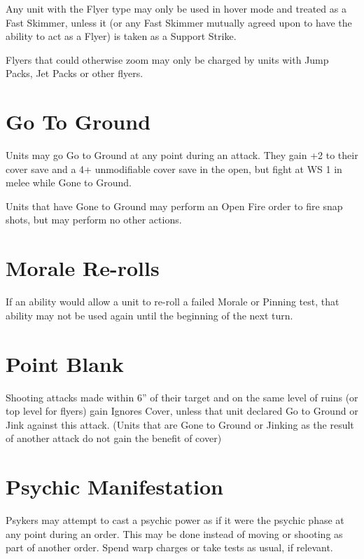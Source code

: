 \documentclass[letterpaper,twocolumn,oneside,titlepage]{book}
\begin{document}
Any unit with the Flyer type may only be used in hover mode and treated
as a Fast Skimmer, unless it (or any Fast Skimmer mutually agreed upon
to have the ability to act as a Flyer) is taken as a Support Strike.

Flyers that could otherwise zoom may only be charged by units with Jump
Packs, Jet Packs or other flyers.

\section{\texorpdfstring{\textbf{Go To
Ground}}{Go To Ground}}\label{go-to-ground}

Units may go Go to Ground at any point during an attack. They gain +2 to
their cover save and a 4+ unmodifiable cover save in the open, but fight
at WS 1 in melee while Gone to Ground.

Units that have Gone to Ground may perform an Open Fire order to fire
snap shots, but may perform no other actions.

\section{\texorpdfstring{\textbf{Morale
Re-rolls}}{Morale Re-rolls}}\label{morale-re-rolls}

If an ability would allow a unit to re-roll a failed Morale or Pinning
test, that ability may not be used again until the beginning of the next
turn.

\section{\texorpdfstring{\textbf{Point
Blank}}{Point Blank}}\label{point-blank}

Shooting attacks made within 6'' of their target and on the same level
of ruins (or top level for flyers) gain Ignores Cover, unless that unit
declared Go to Ground or Jink against this attack. (Units that are Gone
to Ground or Jinking as the result of another attack do not gain the
benefit of cover)

\section{\texorpdfstring{\textbf{Psychic
Manifestation}}{Psychic Manifestation}}\label{psychic-manifestation}

Psykers may attempt to cast a psychic power as if it were the psychic
phase at any point during an order. This may be done instead of moving
or shooting as part of another order. Spend warp charges or take tests
as usual, if relevant.
\end{document}
